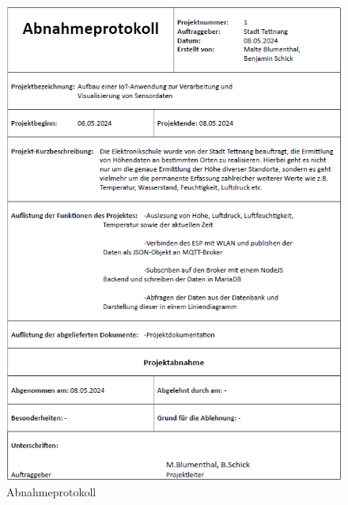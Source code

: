 \begin{figure}[h]
	\centering
	\includegraphics[width=14cm]{images/Abnahmeprotokoll.png}
	\caption{Abnahmeprotokoll}
	\label{fig:abnahmeprotokoll}
\end{figure}
